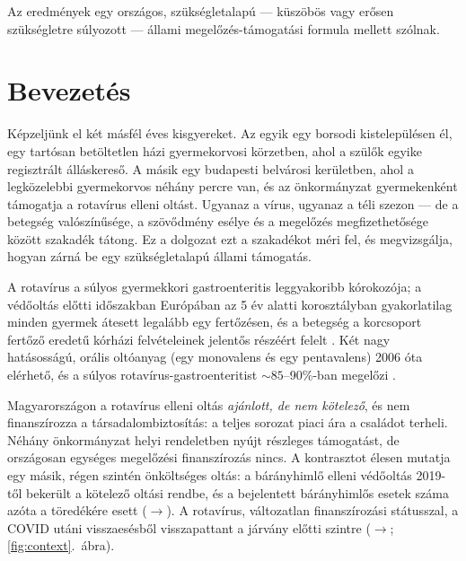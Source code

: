 \documentclass[12pt,a4paper]{article}
\begin{document}
\medskip
\noindent Az eredmények egy országos, szükségletalapú --- küszöbös vagy
erősen szükségletre súlyozott --- állami megelőzés-támogatási formula mellett
szólnak.

\clearpage
\tableofcontents

\tdkmaintext
\section{Bevezetés}

Képzeljünk el két másfél éves kisgyereket. Az egyik egy borsodi kistelepülésen
él, egy tartósan betöltetlen házi gyermekorvosi körzetben, ahol a szülők
egyike regisztrált álláskereső. A másik egy budapesti belvárosi kerületben,
ahol a legközelebbi gyermekorvos néhány percre van, és az önkormányzat
gyermekenként támogatja a rotavírus elleni oltást. Ugyanaz a vírus, ugyanaz
a téli szezon --- de a betegség valószínűsége, a szövődmény esélye és a
megelőzés megfizethetősége között szakadék tátong. Ez a dolgozat ezt a
szakadékot méri fel, és megvizsgálja, hogyan zárná be egy szükségletalapú
állami támogatás.

A rotavírus a súlyos gyermekkori gastroenteritis leggyakoribb kórokozója; a
védőoltás előtti időszakban Európában az 5 év alatti korosztályban gyakorlatilag
minden gyermek átesett legalább egy fertőzésen, és a betegség a korcsoport
fertőző eredetű kórházi felvételeinek jelentős részéért felelt
\citep{soriano2006,who2021rota}. Két nagy hatásosságú, orális oltóanyag
(egy monovalens és egy pentavalens) 2006 óta elérhető, és a súlyos
rotavírus-gastroenteritist ${\sim}85$--90\%-ban megelőzi
\citep{vesikari2006,ruizpalacios2006,who2021rota}.

Magyarországon a rotavírus elleni oltás \emph{ajánlott, de nem kötelező}, és
nem finanszírozza a társadalombiztosítás: a teljes sorozat piaci ára a
családot terheli. Néhány önkormányzat helyi rendeletben nyújt részleges
támogatást, de országosan egységes megelőzési finanszírozás nincs. A
kontrasztot élesen mutatja egy másik, régen szintén önköltséges oltás: a
bárányhimlő elleni védőoltás 2019-től bekerült a kötelező oltási rendbe, és
a bejelentett bárányhimlős esetek száma azóta a töredékére esett
(\variAnnPre{}$\to$\variAnnXs). A rotavírus, változatlan finanszírozási
státusszal, a COVID utáni visszaesésből visszapattant a járvány előtti
szintre (\rotaAnnPre{}$\to$\rotaAnnXs; \ref{fig:context}.~ábra).
\end{document}
